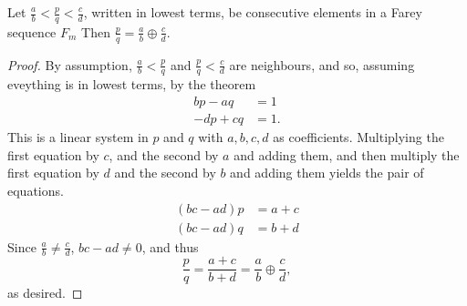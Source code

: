 \documentclass[12pt]{article}
\begin{document}
\begin{cor}Let $\frac{a}{b} < \frac{p}{q} < \frac{c}{d}$, written in lowest terms, be consecutive elements in a Farey sequence $F_m$ Then $\frac{p}{q} = \frac{a}{b}\oplus \frac{c}{d}$.\end{cor}
\begin{proof}By assumption, $\frac ab < \frac pq$ and $\frac pq < \frac cd$ are neighbours, and so, assuming eveything is in lowest terms, by the theorem
\begin{align*}
bp - aq &= 1\\
-dp + cq &= 1.\end{align*}
This is a linear system in $p$ and $q$ with $a,b,c,d$ as coefficients. Multiplying the first equation by $c$, and the second by $a$ and adding them, and then multiply the first equation by $d$ and the second by $b$ and adding them yields the pair of equations.
\begin{align*}(bc-ad)p& = a+c\\
(bc-ad)q &= b+d\end{align*}
Since $\frac{a}{b} \neq \frac{c}{d}$, $bc-ad \neq 0$, and thus 
\[\frac{p}{q} = \frac{a+c}{b+d} =  \frac ab \oplus \frac cd,\] as desired.
\end{proof}
\end{document}
